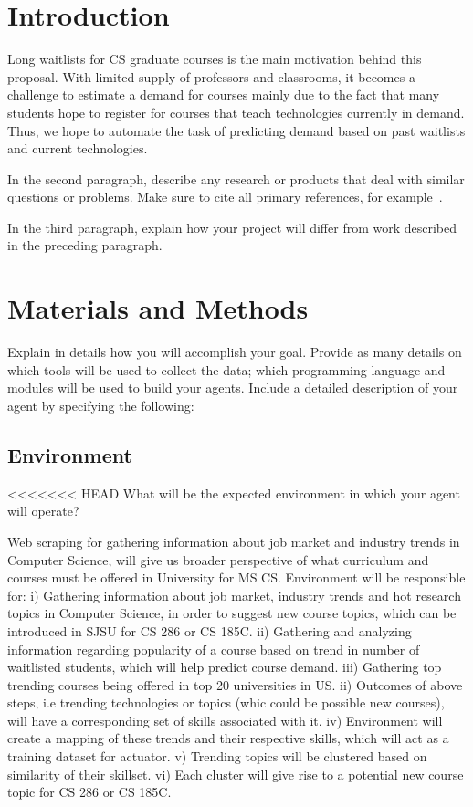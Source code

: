 \documentclass{article}
\begin{document}
\section{Introduction}

Long waitlists for CS graduate courses is the main motivation behind this proposal. With limited supply of professors and classrooms, it becomes a challenge to estimate a demand for courses mainly due to the fact that many students hope to register for courses that teach technologies currently in demand. Thus, we hope to automate the task of predicting demand based on past waitlists and current technologies. 

In the second paragraph, describe any research or products that deal with similar questions or problems.  Make sure to cite all primary references, for example~\cite{einstein}.

In the third paragraph, explain how your project will differ from work described in the preceding paragraph. 

\section{Materials and Methods}
Explain in details how you will accomplish your goal.  Provide as many details on which tools will be used to collect the data; which programming language and modules will be used to build your agents.
Include a detailed description of your agent by specifying the following:
\subsection{Environment}
<<<<<<< HEAD
What will be the expected environment in which your agent will operate?

Web scraping for gathering information about job market and industry trends in Computer Science, will give us broader perspective of what curriculum and courses must be offered in University for MS CS.
Environment will be responsible for:
i)  Gathering information about job market, industry trends and hot research topics in Computer Science, in order to suggest new course topics, which can be introduced in SJSU for CS 286 or CS 185C.
ii) Gathering and analyzing information regarding popularity of a course based on trend in number of waitlisted students, which will help predict course demand.
iii) Gathering top trending courses being offered in top 20 universities in US.
ii) Outcomes of above steps, i.e trending technologies or topics (whic could be possible new courses), will have a corresponding set of skills associated with it.
iv) Environment will create a mapping of these trends and their respective skills, which will act as a training dataset for actuator.
v) Trending topics will be clustered based on similarity of their skillset.
vi) Each cluster will give rise to a potential new course topic for CS 286 or CS 185C. 
\end{document}
